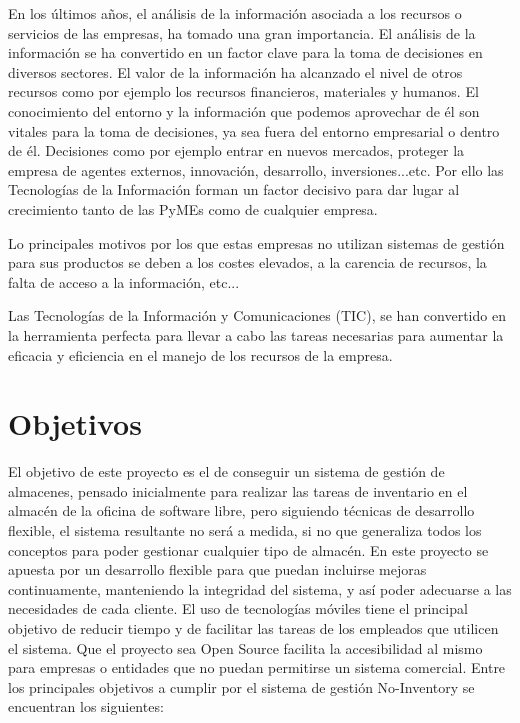 \documentclass[a4paper,11pt]{book}
\begin{document}
En los últimos años, el análisis de la información asociada a los recursos o servicios de las empresas, ha tomado una gran importancia. El análisis de la información se ha convertido en un factor clave para la toma de decisiones en diversos sectores. El valor de la información ha alcanzado el nivel de otros recursos como por ejemplo los recursos financieros, materiales y humanos. El conocimiento del entorno y la información que podemos aprovechar de él son vitales para la toma de decisiones, ya sea fuera del entorno empresarial o dentro de él. Decisiones como por ejemplo entrar en nuevos mercados, proteger la empresa de agentes externos, innovación, desarrollo, inversiones...etc. Por ello las Tecnologías de la Información forman un factor decisivo para dar lugar al crecimiento tanto de las PyMEs como de cualquier empresa.

Lo principales motivos por los que estas empresas no utilizan sistemas de gestión para sus productos se deben a los costes elevados, a la carencia de recursos, la falta de acceso a la información, etc... 

Las Tecnologías de la Información y Comunicaciones (TIC), se han convertido en la herramienta perfecta para llevar a cabo las tareas necesarias para aumentar 
la eficacia y eficiencia en el manejo de los recursos de la empresa.



\section{Objetivos}

El objetivo de este proyecto es el de conseguir un sistema de gestión de almacenes, pensado inicialmente para realizar las tareas de inventario en el almacén de la oficina de software libre, pero siguiendo técnicas de desarrollo flexible, el sistema resultante no será a medida, si no que generaliza todos los conceptos para poder gestionar cualquier tipo de almacén.  En este proyecto se apuesta por un desarrollo flexible para que puedan incluirse mejoras continuamente, manteniendo la integridad del sistema, y así poder adecuarse a las necesidades de cada cliente. El uso de tecnologías móviles tiene el principal objetivo de reducir tiempo y de facilitar las tareas de los empleados que utilicen el sistema. Que el proyecto sea Open Source facilita la accesibilidad al mismo para empresas o entidades que no puedan permitirse un sistema comercial. Entre los principales objetivos a cumplir por el sistema de gestión No-Inventory se encuentran los siguientes:
\end{document}
